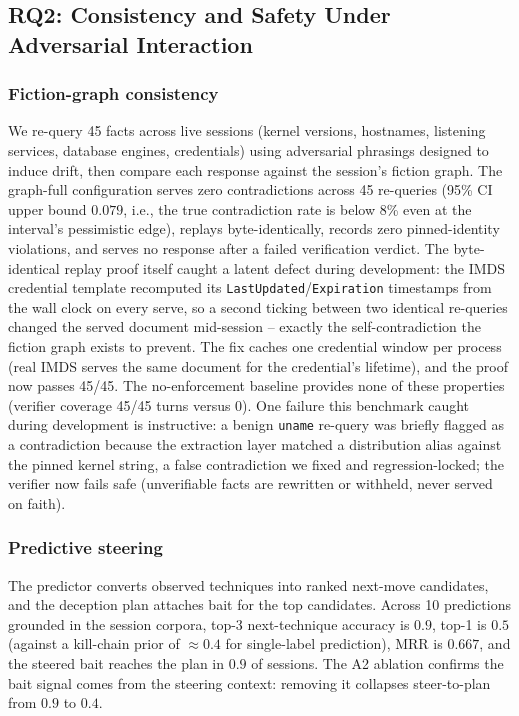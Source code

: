 \subsection{RQ2: Consistency and Safety Under Adversarial Interaction}
\label{sec:rq2}

\subsubsection{Fiction-graph consistency}
We re-query 45 facts across live sessions (kernel versions, hostnames,
listening services, database engines, credentials) using adversarial
phrasings designed to induce drift, then compare each response against
the session's fiction graph. The graph-full configuration serves zero
contradictions across 45 re-queries (95\% CI upper bound $0.079$, i.e.,
the true contradiction rate is below 8\% even at the interval's
pessimistic edge), replays byte-identically, records
zero pinned-identity violations, and serves no response after a failed
verification verdict. The byte-identical replay proof itself caught a
latent defect during development: the IMDS credential template
recomputed its \texttt{LastUpdated}/\texttt{Expiration} timestamps from
the wall clock on every serve, so a second ticking between two identical
re-queries changed the served document mid-session -- exactly the
self-contradiction the fiction graph exists to prevent. The fix caches
one credential window per process (real IMDS serves the same document
for the credential's lifetime), and the proof now passes 45/45. The no-enforcement baseline provides none of these
properties (verifier coverage 45/45 turns versus 0). One failure this
benchmark caught during development is instructive: a benign
\texttt{uname} re-query was briefly flagged as a contradiction because
the extraction layer matched a distribution alias against the pinned
kernel string, a false contradiction we fixed and regression-locked; the
verifier now fails safe (unverifiable facts are rewritten or withheld,
never served on faith).

\subsubsection{Predictive steering}
The \attck predictor converts observed techniques into ranked next-move
candidates, and the deception plan attaches bait for the top candidates.
Across 10 predictions grounded in the session corpora, top-3 next-technique
accuracy is $0.9$, top-1 is $0.5$ (against a kill-chain prior of
${\approx}0.4$ for single-label prediction), MRR is $0.667$, and the
steered bait reaches the plan in $0.9$ of sessions. The A2 ablation
confirms the bait signal comes from the steering context: removing it
collapses steer-to-plan from $0.9$ to $0.4$.

